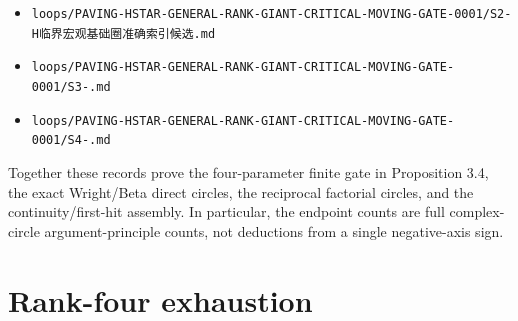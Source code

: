 \documentclass[10pt]{article}
\begin{document}
\begin{itemize}
\item \texttt{loops/\allowbreak{}PAVING-\allowbreak{}HSTAR-\allowbreak{}GENERAL-\allowbreak{}RANK-\allowbreak{}GIANT-\allowbreak{}CRITICAL-\allowbreak{}MOVING-\allowbreak{}GATE-\allowbreak{}0001/\allowbreak{}S2-H{\cjkfont 临\allowbreak{}界\allowbreak{}宏\allowbreak{}观\allowbreak{}基\allowbreak{}础\allowbreak{}圈\allowbreak{}准\allowbreak{}确\allowbreak{}索\allowbreak{}引\allowbreak{}候\allowbreak{}选}.\allowbreak{}md}
\item \texttt{loops/\allowbreak{}PAVING-\allowbreak{}HSTAR-\allowbreak{}GENERAL-\allowbreak{}RANK-\allowbreak{}GIANT-\allowbreak{}CRITICAL-\allowbreak{}MOVING-\allowbreak{}GATE-\allowbreak{}0001/\allowbreak{}S3-.\allowbreak{}md}
\item \texttt{loops/\allowbreak{}PAVING-\allowbreak{}HSTAR-\allowbreak{}GENERAL-\allowbreak{}RANK-\allowbreak{}GIANT-\allowbreak{}CRITICAL-\allowbreak{}MOVING-\allowbreak{}GATE-\allowbreak{}0001/\allowbreak{}S4-.\allowbreak{}md}
\end{itemize}

Together these records prove the four-parameter finite gate in Proposition 3.4,
the exact Wright/Beta direct circles, the reciprocal factorial circles, and the
continuity/first-hit assembly.  In particular, the endpoint counts are full
complex-circle argument-principle counts, not deductions from a single
negative-axis sign.

\section{Rank-four exhaustion}
\end{document}

